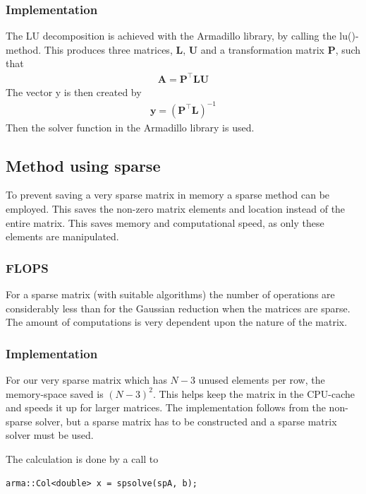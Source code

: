 \documentclass[11pt,a4paper,english]{article}
\numberwithin{equation}{section}
\newcommand{\ve}[1]{\mathbf{#1}} %
\newcommand{\trans}[1]{#1^\top}
\begin{document}
\subsubsection{Implementation}

The LU decomposition is achieved with the Armadillo library, by calling
the lu()-method. This produces three matrices, $\ve{L}$, $\ve{U}$ and a transformation
matrix $\ve{P}$, such that
\begin{gather}
\ve{A} = \ve{ \trans{P}LU }
\end{gather}
The vector y is then created by
\begin{gather}
\ve{y} = \left( \ve{ \trans{P}L }  \right)^{-1}
\end{gather}
Then the solver function in the Armadillo library is used.

\subsection{Method using sparse}

To prevent saving a very sparse matrix in memory a sparse method can be employed.
This saves the non-zero matrix elements and location instead of the 
entire matrix. This saves memory and computational speed, as only these
elements are manipulated.

\subsubsection{FLOPS}

For a sparse matrix (with suitable algorithms) the number of operations are considerably
less than for the Gaussian reduction when the matrices are sparse.
The amount of computations is very dependent upon the nature of the matrix.

\subsubsection{Implementation}

For our very sparse matrix which has $N-3$ unused elements per row, the
memory-space saved is $(N-3)^2$. This helps keep the matrix in the 
CPU-cache and speeds it up for larger matrices. The implementation follows
from the non-sparse solver, but a sparse matrix has to be constructed and 
a sparse matrix solver must be used.

The calculation is done by a call to
\begin{lstlisting}
arma::Col<double> x = spsolve(spA, b);
\end{lstlisting}
\end{document}
